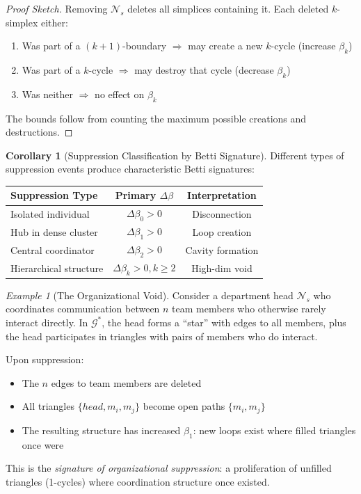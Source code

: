 \documentclass[12pt,a4paper]{article}
\theoremstyle{definition}
\newtheorem{corollary}[theorem]{Corollary}
\theoremstyle{remark}
\newtheorem{example}{Example}[section]
\newcommand{\NS}{\mathcal{N}_s}          %
\newcommand{\Graph}{\mathcal{G}}         %
\begin{document}
\begin{proof}[Proof Sketch]
Removing $\NS$ deletes all simplices containing it. Each deleted $k$-simplex either:
\begin{enumerate}
    \item Was part of a $(k+1)$-boundary $\Rightarrow$ may create a new $k$-cycle (increase $\beta_k$)
    \item Was part of a $k$-cycle $\Rightarrow$ may destroy that cycle (decrease $\beta_k$)
    \item Was neither $\Rightarrow$ no effect on $\beta_k$
\end{enumerate}
The bounds follow from counting the maximum possible creations and destructions.
\end{proof}

\begin{corollary}[Suppression Classification by Betti Signature]
\label{cor:betti-classification}
Different types of suppression events produce characteristic Betti signatures:

\begin{center}
\renewcommand{\arraystretch}{1.3}
\begin{tabular}{lcc}
\toprule
\textbf{Suppression Type} & \textbf{Primary $\Delta\beta$} & \textbf{Interpretation} \\
\midrule
Isolated individual & $\Delta\beta_0 > 0$ & Disconnection \\
Hub in dense cluster & $\Delta\beta_1 > 0$ & Loop creation \\
Central coordinator & $\Delta\beta_2 > 0$ & Cavity formation \\
Hierarchical structure & $\Delta\beta_k > 0, k \geq 2$ & High-dim void \\
\bottomrule
\end{tabular}
\end{center}
\end{corollary}

\begin{example}[The Organizational Void]
Consider a department head $\NS$ who coordinates communication between $n$ team members who otherwise rarely interact directly. In $\Graph^*$, the head forms a ``star'' with edges to all members, plus the head participates in triangles with pairs of members who do interact.

Upon suppression:
\begin{itemize}
    \item The $n$ edges to team members are deleted
    \item All triangles $\{head, m_i, m_j\}$ become open paths $\{m_i, m_j\}$
    \item The resulting structure has increased $\beta_1$: new loops exist where filled triangles once were
\end{itemize}

This is the \emph{signature of organizational suppression}: a proliferation of unfilled triangles (1-cycles) where coordination structure once existed.
\end{example}
\end{document}
